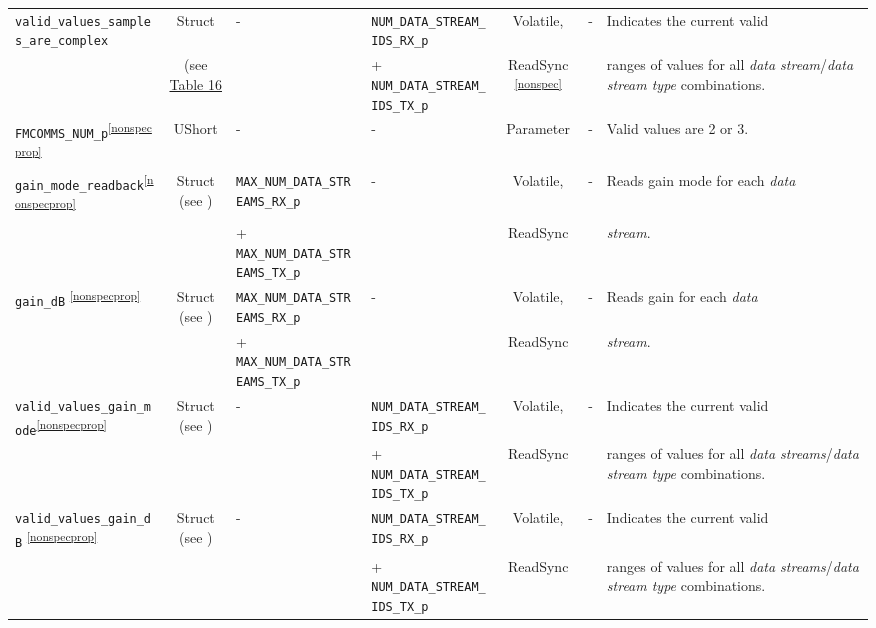 \documentclass{article}
\begin{document}
\begin{landscape}
\begin{scriptsize}
\begin{longtable}{|p{5.16cm}|c|p{3.5cm}|p{3.4cm}|c|p{2.1cm}|p{3.75cm}|}
			\hline
			\verb+valid_values_samples_are_complex+& Struct & - & \verb+NUM_DATA_STREAM_IDS_RX_p+  & Volatile,   & -       & Indicates the current valid \\
			 & (see \hyperlink{tab16}{Table 16} & & + \verb+NUM_DATA_STREAM_IDS_TX_p+&  ReadSync \textsuperscript{\ref{nonspec}} & & ranges of values for all \textit{data stream}/\textit{data stream type} combinations. \\
			\hline
			\verb+FMCOMMS_NUM_p+\textsuperscript{\ref{nonspecprop}}       & UShort & -        & -          & Parameter           & -       & Valid values are 2 or 3. \\
			\hline
			\verb+gain_mode_readback+\textsuperscript{\ref{nonspecprop}}    & Struct (see ) & \verb+MAX_NUM_DATA_STREAMS_RX_p+ & - &Volatile, & -       & Reads gain mode for each \textit{data}\\
			                             &               &                                                                     + \verb+MAX_NUM_DATA_STREAMS_TX_p+ &   & ReadSync &         & \textit{stream}. \\
			\hline
			\verb+gain_dB+ \textsuperscript{\ref{nonspecprop}}    & Struct (see ) & \verb+MAX_NUM_DATA_STREAMS_RX_p+ & - &Volatile, & -       & Reads gain for each \textit{data}\\
			                             &               &                                                                     + \verb+MAX_NUM_DATA_STREAMS_TX_p+ &   & ReadSync &         & \textit{stream}. \\
			\hline
			\verb+valid_values_gain_mode+\textsuperscript{\ref{nonspecprop}}    & Struct  (see )& - & \verb+NUM_DATA_STREAM_IDS_RX_p+ & Volatile,   & -       & Indicates the current valid \\
			                             &               &                                                                     &  + \verb+NUM_DATA_STREAM_IDS_TX_p+  & ReadSync &         & ranges of values for all \textit{data streams}/\textit{data stream type} combinations. \\
			\hline
			\verb+valid_values_gain_dB+ \textsuperscript{\ref{nonspecprop}}    & Struct  (see )& - & \verb+NUM_DATA_STREAM_IDS_RX_p+ & Volatile,   & -       & Indicates the current valid \\
			                             &               &                                                                     &  + \verb+NUM_DATA_STREAM_IDS_TX_p+  & ReadSync &         & ranges of values for all \textit{data streams}/\textit{data stream type} combinations. \\

\end{longtable}
\end{scriptsize}
\end{landscape}
\end{document}
